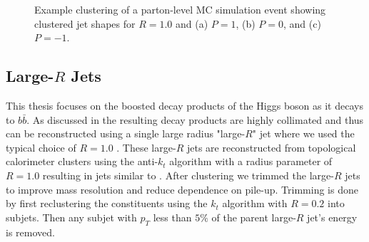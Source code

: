 \begin{figure}[!htbp]
  \centering

  \caption{\cite{Cacciari:2008gp} Example clustering of a parton-level MC simulation event showing clustered jet shapes for $R=1.0$ and (a) $P=1$, (b) $P=0$, and (c) $P=-1$.}
  \label{simulated_background_shapes}
\end{figure}

\subsection{Large-$R$ Jets} \label{sec:objects:fatjet}
This thesis focuses on the boosted decay products of the Higgs boson as it
decays to $b\bar{b}$.  As discussed in  the resulting
decay products are highly collimated and thus can be reconstructed using a
single large radius "large-$R$" jet where we used the typical choice of $R=1.0$
\cite{Aaboud:2018kfi,Aaboud:2017hdf}.  These large-$R$ jets are reconstructed
from topological calorimeter clusters using the anti-$k_{t}$ algorithm with a
radius parameter of $R = 1.0$ resulting in jets similar to
. After clustering we trimmed
\cite{Krohn:2009th} the large-$R$ jets to improve mass resolution and reduce
dependence on pile-up. Trimming is done by first reclustering the constituents
using the $k_{t}$ algorithm with $R=0.2$ into subjets.  Then any subjet with
$p_{T}$ less than $5\%$ of the parent large-$R$ jet's energy is removed.

